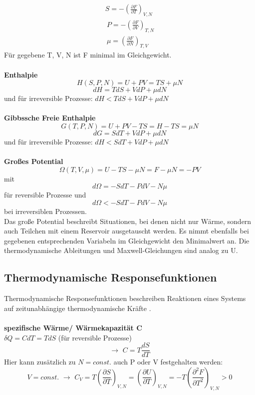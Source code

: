 \documentclass[a4paper,11pt]{scrartcl}
\begin{document}
\begin{equation}
  \begin{split}
 S = - \left(\frac{\partial F}{\partial T} \right)_{V,N}  \\\
 P = - \left(\frac{\partial F}{\partial V} \right)_{T,N}  \\\
 \mu = \left(\frac{\partial F}{\partial N} \right)_{T,V}
  \end{split}
\end{equation}
Für gegebene T, V, N ist F minimal im Gleichgewicht.\\
\\
\textbf{Enthalpie}\\
$$H(S,P,N) = U + PV = TS + \mu N$$
$$ dH = TdS + VdP + \mu dN$$ und für irreversible Prozesse: $dH < TdS + VdP + \mu dN$\\
\\
\textbf{Gibbssche Freie Enthalpie}\\
$$G(T, P, N ) = U+PV-TS= H-TS = \mu N$$
$$ dG = SdT + VdP + \mu dN$$ und für irreversible Prozesse: $dH < SdT + VdP + \mu dN$\\
\\
\textbf{Großes Potential}\\
$$\Omega (T,V,\mu) = U -TS-\mu N = F-\mu N = -PV$$
mit $$d \Omega = -SdT- PdV - N\mu $$ für reversible Prozesse und $$d \Omega < -SdT- PdV - N\mu $$ bei irreversiblen Prozessen. \\
Das große Potential beschreibt Situationen, bei denen nicht nur Wärme, sondern auch Teilchen mit einem Reservoir ausgetauscht werden. Es nimmt ebenfalls bei gegebenen entsprechenden Variabeln im Gleichgewicht den Minimalwert an. Die thermodynamische Ableitungen und Maxwell-Gleichungen sind analog zu U.
\subsection{Thermodynamische Responsefunktionen}
Thermodynamische Responsefunktionen beschreiben Reaktionen eines Systems auf zeitunabhängige \glqq thermodynamische Kräfte \grqq.\\
\\
\textbf{spezifische Wärme/ Wärmekapazität C}\\
$\delta Q = C dT = TdS$ (für reversible Prozesse) 
$$\rightarrow \,\, C = T \frac{dS}{dT}$$
Hier kann zusätzlich zu $N = const.$ auch P oder V festgehalten werden:
\begin{equation}
 V = const. \,\, \rightarrow \,\, C_V = T \left( \frac{\partial S}{\partial T }\right)_{V,N} = \left( \frac{\partial U}{\partial T }\right)_{V,N} = - T \left( \frac{\partial^2 F}{\partial T^2} \right)_{V,N} > 0
\end{equation}
\end{document}
